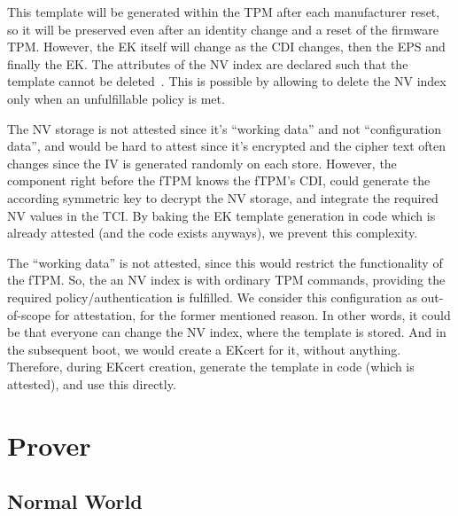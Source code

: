 This template will be generated within the TPM after each manufacturer reset, so it will be preserved even after an identity change and a reset of the firmware TPM\@.
However, the EK itself will change as the CDI changes, then the EPS and finally the EK\@.
The attributes of the NV index are declared such that the template cannot be deleted~\cite{tcgPcClient}.
This is possible by allowing to delete the NV index only when an unfulfillable policy is met.

The NV storage is not attested since it's ``working data'' and not ``configuration data'', and would be hard to attest since it's encrypted and the cipher text often changes since the IV is generated randomly on each store.
However, the component right before the fTPM knows the fTPM's CDI, could generate the according symmetric key to decrypt the NV storage, and integrate the required NV values in the TCI\@.
By baking the EK template generation in code which is already attested (and the code exists anyways), we prevent this complexity.

The ``working data'' is not attested, since this would restrict the functionality of the fTPM\@.
So, the an NV index is with ordinary TPM commands, providing the required policy/authentication is fulfilled.
We consider this configuration as out-of-scope for attestation, for the former mentioned reason.
In other words, it could be that everyone can change the NV index, where the template is stored.
And in the subsequent boot, we would create a EKcert for it, without anything.
Therefore, during EKcert creation, generate the template in code (which is attested), and use this directly. 


\section{Prover}
\subsection{Normal World}

